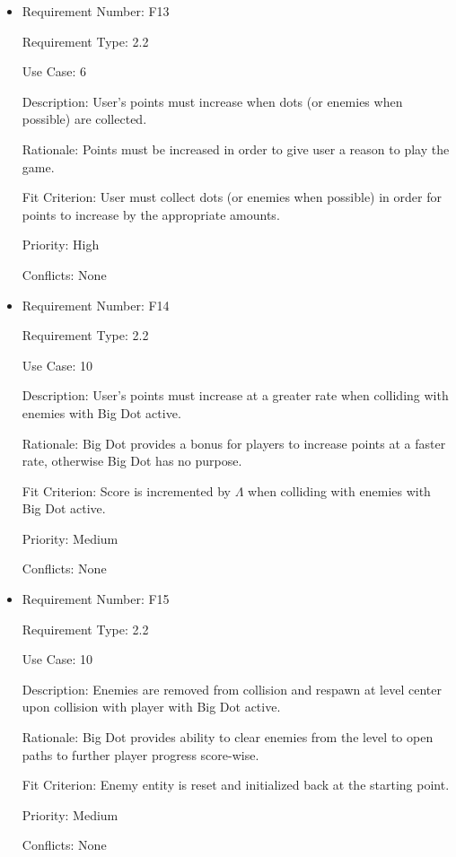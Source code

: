 \documentclass[12pt, titlepage]{article}
\begin{document}
\begin{itemize}
\item
Requirement Number: \hypertarget{f13}{F13}

Requirement Type: 2.2

Use Case: 6

Description: User's points must increase when dots (or enemies when possible) are collected.

Rationale: Points must be increased in order to give user a reason to play the game.

Fit Criterion: User must collect dots (or enemies when possible) in order for points to increase by the appropriate amounts.

Priority: High

Conflicts: None
\end{itemize}

\begin{itemize}
\item
Requirement Number: \hypertarget{f14}{F14}

Requirement Type: 2.2

Use Case: 10

Description: User's points must increase at a greater rate when colliding with enemies with Big Dot active.

Rationale: Big Dot provides a bonus for players to increase points at a faster rate, otherwise Big Dot has no purpose.

Fit Criterion: Score is incremented by $\hyperref[tab:constants]{\Lambda}$ when colliding with enemies with Big Dot active.

Priority: Medium

Conflicts: None
\end{itemize}

\begin{itemize}
\item
Requirement Number: \hypertarget{f15}{F15}

Requirement Type: 2.2

Use Case: 10

Description: Enemies are removed from collision and respawn at level center upon collision with player with Big Dot active.

Rationale: Big Dot provides ability to clear enemies from the level to open paths to further player progress score-wise.

Fit Criterion: Enemy entity is reset and initialized back at the starting point.

Priority: Medium

Conflicts: None
\end{itemize}
\end{document}
